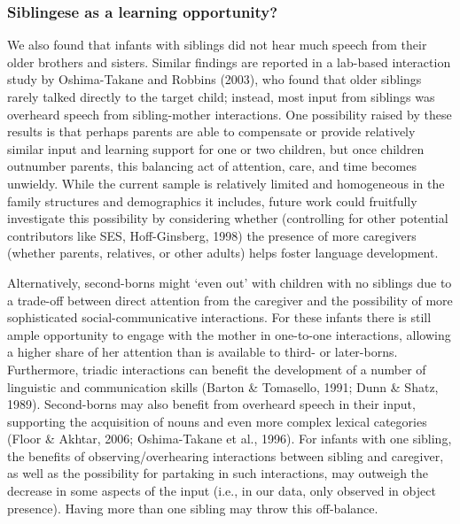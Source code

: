 \documentclass[
  man,mask,floatsintext]{apa6}
\begin{document}
\hypertarget{siblingese-as-a-learning-opportunity}{%
\subsubsection{Siblingese as a learning opportunity?}\label{siblingese-as-a-learning-opportunity}}

We also found that infants with siblings did not hear much speech from their older brothers and sisters. Similar findings are reported in a lab-based interaction study by Oshima-Takane and Robbins (2003), who found that older siblings rarely talked directly to the target child; instead, most input from siblings was overheard speech from sibling-mother interactions. One possibility raised by these results is that perhaps parents are able to compensate or provide relatively similar input and learning support for one or two children, but once children outnumber parents, this balancing act of attention, care, and time becomes unwieldy. While the current sample is relatively limited and homogeneous in the family structures and demographics it includes, future work could fruitfully investigate this possibility by considering whether (controlling for other potential contributors like SES, Hoff-Ginsberg, 1998) the presence of more caregivers (whether parents, relatives, or other adults) helps foster language development.

Alternatively, second-borns might `even out' with children with no siblings due to a trade-off between direct attention from the caregiver and the possibility of more sophisticated social-communicative interactions. For these infants there is still ample opportunity to engage with the mother in one-to-one interactions, allowing a higher share of her attention than is available to third- or later-borns. Furthermore, triadic interactions can benefit the development of a number of linguistic and communication skills (Barton \& Tomasello, 1991; Dunn \& Shatz, 1989). Second-borns may also benefit from overheard speech in their input, supporting the acquisition of nouns and even more complex lexical categories (Floor \& Akhtar, 2006; Oshima-Takane et al., 1996). For infants with one sibling, the benefits of observing/overhearing interactions between sibling and caregiver, as well as the possibility for partaking in such interactions, may outweigh the decrease in some aspects of the input (i.e., in our data, only observed in object presence). Having more than one sibling may throw this off-balance.
\end{document}
